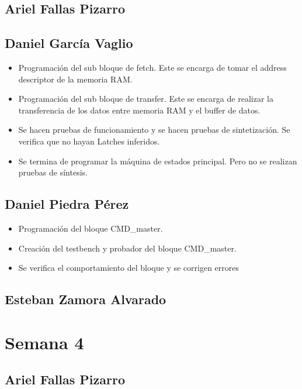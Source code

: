 \subsection{Ariel Fallas Pizarro}


\subsection{Daniel García Vaglio}
\begin{itemize}
\item Programación del sub bloque de fetch. Este se encarga de tomar el address descriptor de la
  memoria RAM. 
\item Programación del sub bloque de transfer. Este se encarga de realizar la transferencia de los
  datos entre memoria RAM y el buffer de datos. 
\item Se hacen pruebas de funcionamiento y se hacen pruebas de sintetización. Se verifica que no
  hayan Latches inferidos. 
\item Se termina de programar la máquina de estados principal. Pero no se realizan pruebas de
  síntesis.  
\end{itemize}

\subsection{Daniel Piedra Pérez}
\begin{itemize}
\item Programación del bloque CMD\_master.
\item Creación del testbench y probador del bloque CMD\_master.
\item Se verifica el comportamiento del bloque y se corrigen errores
\end{itemize}

\subsection{Esteban Zamora Alvarado}

\newpage

\section{Semana 4}
\subsection{Ariel Fallas Pizarro}


